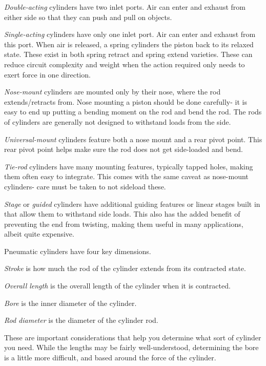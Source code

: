 \documentclass[10pt,letterpaper]{book}
\begin{document}
\begin{asparaenum}[a)]
	\item  \textit{Double-acting} cylinders have two inlet ports. Air can enter and exhaust from either side so that they can push and pull on objects.
	\item \textit{Single-acting} cylinders have only one inlet port. Air can enter and exhaust from this port. When air is released, a spring cylinders the piston back to its relaxed state. These exist in both spring retract and spring extend varieties. These can reduce circuit complexity and weight when the action required only needs to exert force in one direction.
	\item \textit{Nose-mount} cylinders are mounted only by their nose, where the rod extends/retracts from. Nose mounting a piston should be done carefully- it is easy to end up putting a bending moment on the rod and bend the rod. The rods of cylinders are generally not designed to withstand loads from the side.
	\item \textit{Universal-mount} cylinders feature both a nose mount and a rear pivot point. This rear pivot point helps make sure the rod does not get side-loaded and bend.
	\item \textit{Tie-rod} cylinders have many mounting features, typically tapped holes, making them often easy to integrate. This comes with the same caveat as nose-mount cylinders- care must be taken to not sideload these.
	\item \textit{Stage} or \textit{guided} cylinders have additional guiding features or linear stages built in that allow them to withstand side loads. This also has the added benefit of preventing the end from twisting, making them useful in many applications, albeit quite expensive.
\end{asparaenum}

Pneumatic cylinders have four key dimensions.
\begin{asparaenum}[a)]
	\item \textit{Stroke} is how much the rod of the cylinder extends from its contracted state.
	\item \textit{Overall length} is the overall length of the cylinder when it is contracted.
	\item \textit{Bore} is the inner diameter of the cylinder.
	\item \textit{Rod diameter} is the diameter of the cylinder rod.
\end{asparaenum}

These are important considerations that help you determine what sort of cylinder you need. While the lengths may be fairly well-understood, determining the bore is a little more difficult, and based around the force of the cylinder.
\end{document}
